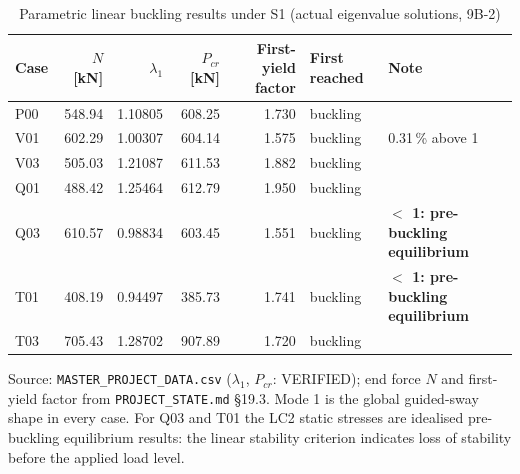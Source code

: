 \begin{table}[htbp]
\centering
\footnotesize
\caption{Parametric linear buckling results under S1 (actual eigenvalue solutions, 9B-2)}
\label{tab:pbk}
\begin{tabular}{lrrrrll}
\toprule
Case & $N$ [kN] & $\lambda_1$ & $P_{cr}$ [kN] & First-yield factor & First reached & Note \\
\midrule
P00 & 548.94 & 1.10805 & 608.25 & 1.730 & buckling &  \\
V01 & 602.29 & 1.00307 & 604.14 & 1.575 & buckling & 0.31\,\% above 1 \\
V03 & 505.03 & 1.21087 & 611.53 & 1.882 & buckling &  \\
Q01 & 488.42 & 1.25464 & 612.79 & 1.950 & buckling &  \\
Q03 & 610.57 & 0.98834 & 603.45 & 1.551 & buckling & \textbf{$<$ 1: pre-buckling equilibrium} \\
T01 & 408.19 & 0.94497 & 385.73 & 1.741 & buckling & \textbf{$<$ 1: pre-buckling equilibrium} \\
T03 & 705.43 & 1.28702 & 907.89 & 1.720 & buckling &  \\
\bottomrule
\end{tabular}
\par\smallskip\parbox{\linewidth}{\footnotesize\raggedright Source: \texttt{MASTER\_PROJECT\_DATA.csv} ($\lambda_1$, $P_{cr}$: VERIFIED); end force $N$ and first-yield factor from \texttt{PROJECT\_STATE.md} \S19.3. Mode 1 is the global guided-sway shape in every case. For Q03 and T01 the LC2 static stresses are idealised pre-buckling equilibrium results: the linear stability criterion indicates loss of stability before the applied load level.}
\end{table}
